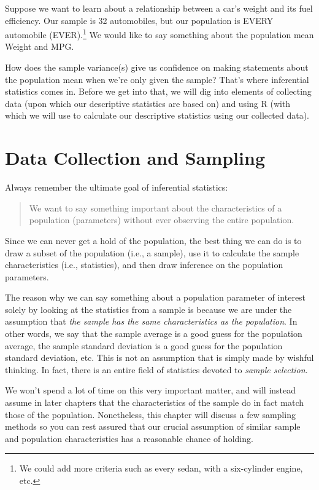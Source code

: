 \documentclass[
]{book}
\begin{document}
Suppose we want to learn about a relationship between a car's weight and its fuel efficiency. Our sample is 32 automobiles, but our population is EVERY automobile (EVER).\footnote{We could add more criteria such as every sedan, with a six-cylinder engine, etc.} We would like to say something about the population mean Weight and MPG.

How does the sample variance(s) give us confidence on making statements about the population mean when we're only given the sample? That's where inferential statistics comes in. Before we get into that, we will dig into elements of collecting data (upon which our descriptive statistics are based on) and using R (with which we will use to calculate our descriptive statistics using our collected data).

\chapter{Data Collection and Sampling}\label{Data}

Always remember the ultimate goal of inferential statistics:

\begin{quote}
We want to say something important about the characteristics of a population (parameters) without ever observing the entire population.
\end{quote}

Since we can never get a hold of the population, the best thing we can do is to draw a subset of the population (i.e., a sample), use it to calculate the sample characteristics (i.e., statistics), and then draw inference on the population parameters.

The reason why we can say something about a population parameter of interest solely by looking at the statistics from a sample is because we are under the assumption that \emph{the sample has the same characteristics as the population}. In other words, we say that the sample average is a good guess for the population average, the sample standard deviation is a good guess for the population standard deviation, etc. This is not an assumption that is simply made by wishful thinking. In fact, there is an entire field of statistics devoted to \emph{sample selection}.

We won't spend a lot of time on this very important matter, and will instead assume in later chapters that the characteristics of the sample do in fact match those of the population. Nonetheless, this chapter will discuss a few sampling methods so you can rest assured that our crucial assumption of similar sample and population characteristics has a reasonable chance of holding.
\end{document}
